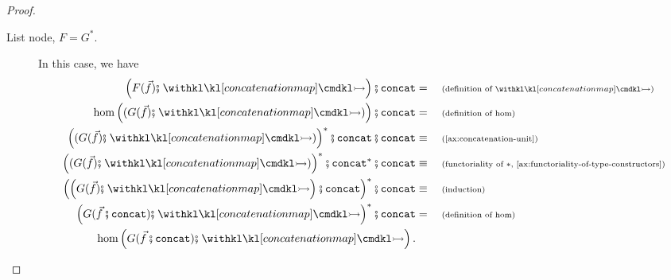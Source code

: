 \begin{proof}
\begin{description}
        \item[List node, $F = G^*$.] In this case, we have 
        \begin{align*}
            \left( F(\vec f) \comp \concmap \right) \comp \concatterm &= \why{definition of $\concmap$} \\ 
            \hom \left( (G(\vec f) \comp \concmap) \right) \comp \concatterm &= \why{definition of $\hom$} \\ 
            \left( (G(\vec f) \comp \concmap) \right)^* \comp \concatterm \comp \concatterm \equalbecause{\cref{ax:concatenation-unit}} \\
            \left( (G(\vec f) \comp \concmap) \right)^* \comp \concatterm^* \comp \concatterm \equalbecause{functoriality of $*$, \cref{ax:functoriality-of-type-constructors}} \\ 
            \left( \left( G(\vec f) \comp \concmap \right) \comp \concatterm \right)^* \comp \concatterm \equalbecause{induction} \\ 
            \left( G(\vec f \comp \concatterm) \comp \concmap \right)^* \comp \concatterm &= \why{definition of $\hom$} \\
            \hom \left( G(\vec f \comp \concatterm) \comp \concmap \right).
        \end{align*}
    \end{description}
\end{proof}